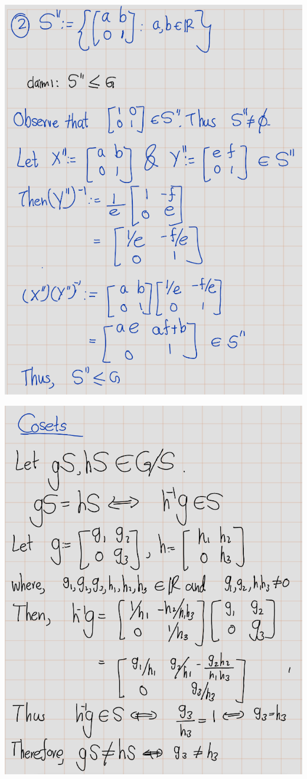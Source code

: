 \documentclass[
]{book}
\theoremstyle{definition}
\theoremstyle{definition}
\theoremstyle{definition}
\theoremstyle{definition}
\theoremstyle{remark}
\begin{document}
\includegraphics{figures/ch_2/fig42.png}

\includegraphics{figures/ch_2/fig43.png}
\end{document}
